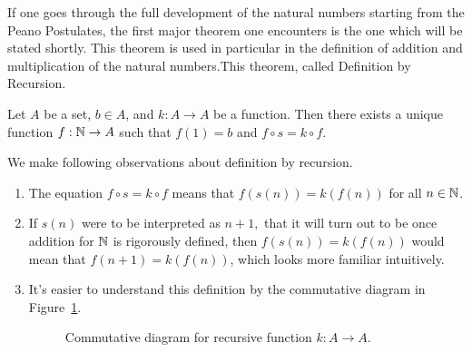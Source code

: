 \documentclass[a4paper,english,12pt]{article}
\begin{document}
If one goes through the full development of the natural numbers starting from the Peano Postulates, the first major theorem one encounters is the one which will be stated shortly. This theorem is used in particular in the definition of addition and multiplication of the natural numbers.This theorem, called Definition by Recursion.

\begin{thm} Let $A$ be a set, $b\in A$, and $k:A \to A$ be a function. Then there exists a unique function $f:\mathbb{N}\to A$ such that $f(1)=b$ and $f \circ s = k \circ f$.
\end{thm}
\begin{rem} We make following observations about definition by recursion.
\begin{enumerate}
	\item The equation $f \circ s = k \circ f$ means that $f(s(n))=k(f(n))$ for all $n \in \mathbb{N}$. 
	\item If $s(n)$ were to be interpreted as $n+1,$ that it will turn out to be once addition for $\mathbb{N}$ is rigorously defined, then $f(s(n))=k(f(n))$ would mean that $f(n+1)=k(f(n))$, which looks more familiar intuitively.
	\item It's easier to understand this definition by the commutative diagram in Figure~\ref{Figure:DfnRcrsn}.
	\begin{figure}[hhhh]%
	\centering
		\scalebox{1.5}{}
	\caption{Commutative diagram for recursive function $k: A \to A$.}%
	\label{Figure:DfnRcrsn}%
	\end{figure}
\end{enumerate}

\end{rem}
\end{document}
